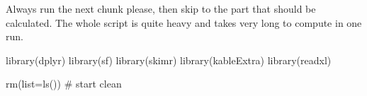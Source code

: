 \documentclass[
  letterpaper,
  DIV=11,
  numbers=noendperiod]{scrreprt}
\newenvironment{Shaded}{\begin{snugshade}}{\end{snugshade}}
\newcommand{\AttributeTok}[1]{\textcolor[rgb]{0.40,0.45,0.13}{#1}}
\newcommand{\CommentTok}[1]{\textcolor[rgb]{0.37,0.37,0.37}{#1}}
\newcommand{\FunctionTok}[1]{\textcolor[rgb]{0.28,0.35,0.67}{#1}}
\newcommand{\NormalTok}[1]{\textcolor[rgb]{0.00,0.23,0.31}{#1}}
\begin{document}
Always run the next chunk please, then skip to the part that should be
calculated. The whole script is quite heavy and takes very long to
compute in one run.

\begin{Shaded}
\begin{Highlighting}[]
\FunctionTok{library}\NormalTok{(dplyr)}
\FunctionTok{library}\NormalTok{(sf)}
\FunctionTok{library}\NormalTok{(skimr)}
\FunctionTok{library}\NormalTok{(kableExtra)}
\FunctionTok{library}\NormalTok{(readxl)}
\end{Highlighting}
\end{Shaded}

\begin{Shaded}
\begin{Highlighting}[]
\FunctionTok{rm}\NormalTok{(}\AttributeTok{list=}\FunctionTok{ls}\NormalTok{()) }\CommentTok{\# start clean}


\end{Highlighting}
\end{Shaded}
\end{document}
